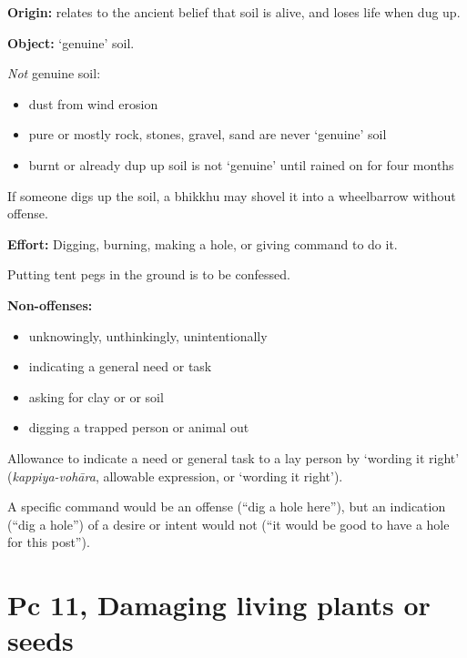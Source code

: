 \begin{multicols}{2}

\textbf{Origin:} relates to the ancient belief that soil is alive, and
loses life when dug up.

\textbf{Object:} `genuine' soil.

\emph{Not} genuine soil:

\begin{itemize}
\tightlist
\item
  dust from wind erosion
\item
  pure or mostly rock, stones, gravel, sand are never `genuine' soil
\item
  burnt or already dup up soil is not `genuine' until rained on for four
  months
\end{itemize}

If someone digs up the soil, a bhikkhu may shovel it into a wheelbarrow
without offense.

\textbf{Effort:} Digging, burning, making a hole, or giving command to
do it.

Putting tent pegs in the ground is to be confessed.

\columnbreak

\textbf{Non-offenses:}

\begin{itemize}
\tightlist
\item
  unknowingly, unthinkingly, unintentionally
\item
  indicating a general need or task
\item
  asking for clay or or soil
\item
  digging a trapped person or animal out
\end{itemize}

Allowance to indicate a need or general task to a lay person by `wording
it right' (\emph{kappiya-vohāra}, allowable expression, or `wording it
right').

A specific command would be an offense (``dig a hole here''), but an
indication (``dig a hole'') of a desire or intent would not (``it would
be good to have a hole for this post'').

\end{multicols}
\clearpage

\section{Pc 11, Damaging living plants or seeds}

